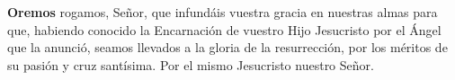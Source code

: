 \textbf{Oremos}
 rogamos, Señor, que infundáis vuestra gracia en nuestras almas para que,
habiendo conocido la Encarnación de vuestro Hijo Jesucristo por el Ángel que la anunció,
seamos llevados a la gloria de la resurrección, por los méritos de su pasión y cruz santísima.
Por el mismo Jesucristo nuestro Señor. 